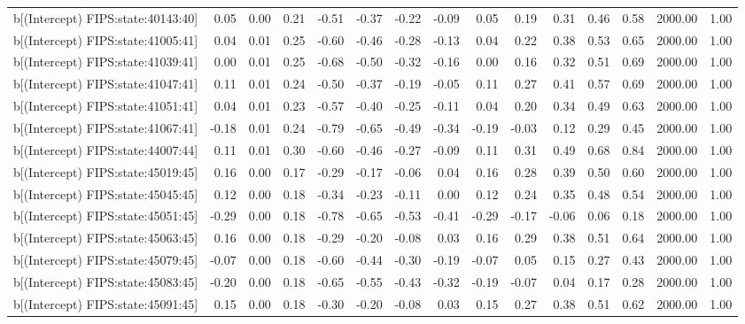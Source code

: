 \begin{table}[ht]
\begin{tabular}{rrrrrrrrrrrrrrr}
  b[(Intercept) FIPS:state:40143:40] & 0.05 & 0.00 & 0.21 & -0.51 & -0.37 & -0.22 & -0.09 & 0.05 & 0.19 & 0.31 & 0.46 & 0.58 & 2000.00 & 1.00 \\ 
  b[(Intercept) FIPS:state:41005:41] & 0.04 & 0.01 & 0.25 & -0.60 & -0.46 & -0.28 & -0.13 & 0.04 & 0.22 & 0.38 & 0.53 & 0.65 & 2000.00 & 1.00 \\ 
  b[(Intercept) FIPS:state:41039:41] & 0.00 & 0.01 & 0.25 & -0.68 & -0.50 & -0.32 & -0.16 & 0.00 & 0.16 & 0.32 & 0.51 & 0.69 & 2000.00 & 1.00 \\ 
  b[(Intercept) FIPS:state:41047:41] & 0.11 & 0.01 & 0.24 & -0.50 & -0.37 & -0.19 & -0.05 & 0.11 & 0.27 & 0.41 & 0.57 & 0.69 & 2000.00 & 1.00 \\ 
  b[(Intercept) FIPS:state:41051:41] & 0.04 & 0.01 & 0.23 & -0.57 & -0.40 & -0.25 & -0.11 & 0.04 & 0.20 & 0.34 & 0.49 & 0.63 & 2000.00 & 1.00 \\ 
  b[(Intercept) FIPS:state:41067:41] & -0.18 & 0.01 & 0.24 & -0.79 & -0.65 & -0.49 & -0.34 & -0.19 & -0.03 & 0.12 & 0.29 & 0.45 & 2000.00 & 1.00 \\ 
  b[(Intercept) FIPS:state:44007:44] & 0.11 & 0.01 & 0.30 & -0.60 & -0.46 & -0.27 & -0.09 & 0.11 & 0.31 & 0.49 & 0.68 & 0.84 & 2000.00 & 1.00 \\ 
  b[(Intercept) FIPS:state:45019:45] & 0.16 & 0.00 & 0.17 & -0.29 & -0.17 & -0.06 & 0.04 & 0.16 & 0.28 & 0.39 & 0.50 & 0.60 & 2000.00 & 1.00 \\ 
  b[(Intercept) FIPS:state:45045:45] & 0.12 & 0.00 & 0.18 & -0.34 & -0.23 & -0.11 & 0.00 & 0.12 & 0.24 & 0.35 & 0.48 & 0.54 & 2000.00 & 1.00 \\ 
  b[(Intercept) FIPS:state:45051:45] & -0.29 & 0.00 & 0.18 & -0.78 & -0.65 & -0.53 & -0.41 & -0.29 & -0.17 & -0.06 & 0.06 & 0.18 & 2000.00 & 1.00 \\ 
  b[(Intercept) FIPS:state:45063:45] & 0.16 & 0.00 & 0.18 & -0.29 & -0.20 & -0.08 & 0.03 & 0.16 & 0.29 & 0.38 & 0.51 & 0.64 & 2000.00 & 1.00 \\ 
  b[(Intercept) FIPS:state:45079:45] & -0.07 & 0.00 & 0.18 & -0.60 & -0.44 & -0.30 & -0.19 & -0.07 & 0.05 & 0.15 & 0.27 & 0.43 & 2000.00 & 1.00 \\ 
  b[(Intercept) FIPS:state:45083:45] & -0.20 & 0.00 & 0.18 & -0.65 & -0.55 & -0.43 & -0.32 & -0.19 & -0.07 & 0.04 & 0.17 & 0.28 & 2000.00 & 1.00 \\ 
  b[(Intercept) FIPS:state:45091:45] & 0.15 & 0.00 & 0.18 & -0.30 & -0.20 & -0.08 & 0.03 & 0.15 & 0.27 & 0.38 & 0.51 & 0.62 & 2000.00 & 1.00 \\ 

\end{tabular}
\end{table}
